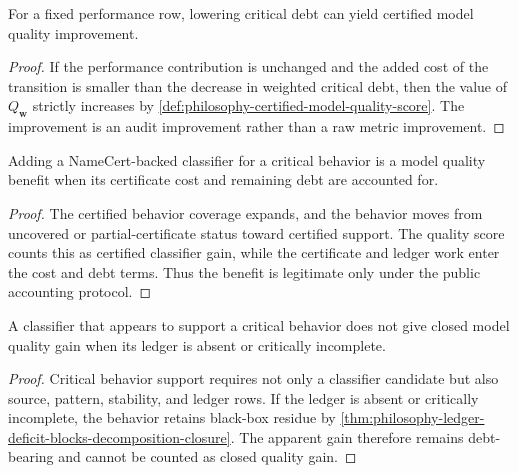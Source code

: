 

\begin{theorem}
\label{thm:philosophy-debt-reduction-can-improve-quality}
For a fixed performance row, lowering critical debt can yield certified
model quality improvement.
\end{theorem}
\begin{proof}
If the performance contribution is unchanged and the added cost of the
transition is smaller than the decrease in weighted critical debt, then
the value of $Q_{\mathbf w}$ strictly increases by
\autoref{def:philosophy-certified-model-quality-score}. The improvement
is an audit improvement rather than a raw metric improvement.
\end{proof}

\begin{theorem}
\label{thm:philosophy-certified-classifier-gain-quality-row}
Adding a NameCert-backed classifier for a critical behavior is a model
quality benefit when its certificate cost and remaining debt are
accounted for.
\end{theorem}
\begin{proof}
The certified behavior coverage expands, and the behavior moves from
uncovered or partial-certificate status toward certified support. The
quality score counts this as certified classifier gain, while the
certificate and ledger work enter the cost and debt terms. Thus the
benefit is legitimate only under the public accounting protocol.
\end{proof}

\begin{theorem}
\label{thm:philosophy-unledgered-classifier-gain-not-closed-quality}
A classifier that appears to support a critical behavior does not give
closed model quality gain when its ledger is absent or critically
incomplete.
\end{theorem}
\begin{proof}
Critical behavior support requires not only a classifier candidate but
also source, pattern, stability, and ledger rows. If the ledger is absent
or critically incomplete, the behavior retains black-box residue by
\autoref{thm:philosophy-ledger-deficit-blocks-decomposition-closure}.
The apparent gain therefore remains debt-bearing and cannot be counted
as closed quality gain.
\end{proof}

